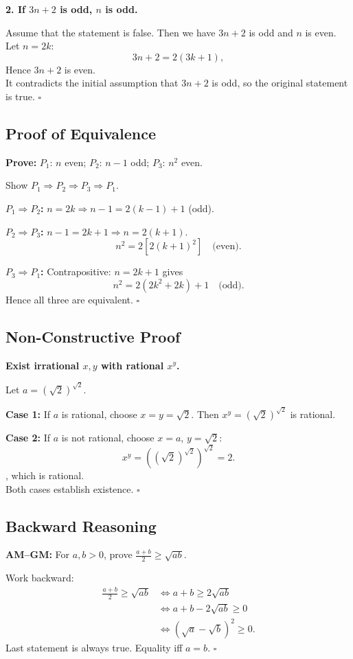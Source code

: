 \textbf{2. If $3n+2$ is odd, $n$ is odd.}

Assume that the statement is false.
Then we have $3n+2$ is odd and $n$ is even.
Let $n=2k$:
\[
3n+2=2(3k+1),
\]
Hence $3n + 2$ is even. \\
It contradicts the initial assumption that $3n + 2$ is odd, so the original statement is true.
$\square$

\subsection{Proof of Equivalence}

\textbf{Prove:}
$P_1$: $n$ even;
$P_2$: $n-1$ odd;
$P_3$: $n^2$ even.

Show $P_1\Rightarrow P_2\Rightarrow P_3
\Rightarrow P_1$.

\textbf{$P_1\Rightarrow P_2$:}
$n=2k\Rightarrow n-1=2(k-1)+1$ (odd).

\textbf{$P_2\Rightarrow P_3$:}
$n-1=2k+1\Rightarrow n=2(k+1)$.
\[
n^2=2[2(k+1)^2]\quad\text{(even)}.
\]

\textbf{$P_3\Rightarrow P_1$:}
Contrapositive: $n=2k+1$ gives
\[
n^2=2(2k^2+2k)+1\quad\text{(odd)}.
\]
Hence all three are equivalent. $\square$

\subsection{Non-Constructive Proof}

\textbf{Exist irrational $x,y$ with rational $x^y$.}

Let $a=(\sqrt2)^{\sqrt2}$.

\textbf{Case 1:} If $a$ is rational, choose
$x=y=\sqrt2$. Then $x^y=(\sqrt2)^{\sqrt2}$ is rational.

\textbf{Case 2:} If $a$ is not rational, choose
$x=a$, $y=\sqrt2$:
\[
x^y=((\sqrt2)^{\sqrt2})^{\sqrt2}=2.
\], which is rational. \\
Both cases establish existence. $\square$

\subsection{Backward Reasoning}

\textbf{AM--GM:} For $a,b>0$, prove
$\frac{a+b}{2}\geq\sqrt{ab}$.

Work backward:
\[
\begin{aligned}
\frac{a+b}{2}\geq\sqrt{ab}
&\iff a+b\geq2\sqrt{ab}\\
&\iff a+b-2\sqrt{ab}\geq0\\
&\iff(\sqrt a-\sqrt b)^2\geq0.
\end{aligned}
\]
Last statement is always true.
Equality iff $a=b$. $\square$
\endgroup


